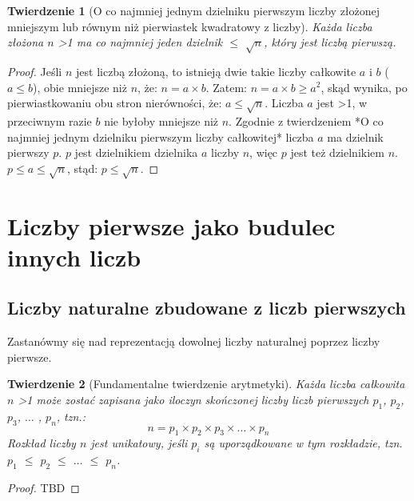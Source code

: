 \documentclass[10pt,onecolumn]{article}
\newtheorem{theorem}{Twierdzenie}
\theoremstyle{definition}
\theoremstyle{hypothesis}
\theoremstyle{capability}
\begin{document}
\begin{theorem} [O co najmniej jednym dzielniku pierwszym liczby złożonej mniejszym lub równym niż pierwiastek kwadratowy z liczby]
Każda liczba złożona $n$ \textgreater 1 ma co najmniej jeden dzielnik $\le$ $\sqrt{n}$, który jest liczbą pierwszą. 
\end{theorem}
 
\begin{proof}
Jeśli $n$ jest liczbą złożoną, to istnieją dwie takie liczby całkowite $a$ i $b$ ($a \leq b$), obie mniejsze niż $n$, że: $n = a \times b$. Zatem: $n = a \times b \geq a^2$, skąd wynika, po pierwiastkowaniu obu stron nierówności, że: $a \leq \sqrt{n}$. Liczba $a$ jest \textgreater 1, w przeciwnym razie $b$ nie byłoby mniejsze niż $n$. Zgodnie z twierdzeniem *O co najmniej jednym dzielniku pierwszym liczby całkowitej* liczba $a$ ma dzielnik pierwszy $p$. $p$ jest dzielnikiem dzielnika $a$ liczby $n$, więc $p$ jest też dzielnikiem $n$. $p \leq a \leq \sqrt{n}$, stąd: $p \leq \sqrt{n}$.
\end{proof}

\newpage


\section{Liczby pierwsze jako budulec innych liczb}

\subsection{Liczby naturalne zbudowane z liczb pierwszych}

Zastanówmy się nad reprezentacją dowolnej liczby naturalnej poprzez liczby pierwsze.

\begin{theorem}[Fundamentalne twierdzenie arytmetyki]
Każda liczba całkowita $n$ \textgreater 1 może zostać zapisana jako iloczyn skończonej liczby liczb pierwszych $p_1$, $p_2$, $p_3$, $\ldots$ , $p_n$, tzn.: $$ n = p_1 \times p_2 \times p_3 \times \ldots \times p_n$$  Rozkład liczby $n$ jest unikatowy, jeśli $p_i$ są uporządkowane w tym rozkładzie, tzn. $p_1$ $\leq$ $p_2$ $\leq$ $\ldots$ $\leq$ $p_n$.
\end{theorem}
 
\begin{proof}
TBD
\end{proof}
\end{document}
